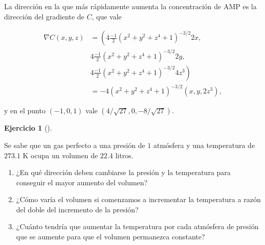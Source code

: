 \documentclass[
  spanish,
  a4paper,
]{scrreport}
\theoremstyle{definition}
\newtheorem{exercise}{Ejercicio}[chapter]
\theoremstyle{remark}
\begin{document}
\begin{tcolorbox}[enhanced jigsaw, arc=.35mm, bottomrule=.15mm, bottomtitle=1mm, breakable, colback=white, colbacktitle=quarto-callout-tip-color!10!white, colframe=quarto-callout-tip-color-frame, coltitle=black, left=2mm, leftrule=.75mm, opacityback=0, opacitybacktitle=0.6, rightrule=.15mm, title=\textcolor{quarto-callout-tip-color}{\faLightbulb}\hspace{0.5em}{Solución}, titlerule=0mm, toprule=.15mm, toptitle=1mm]

La dirección en la que más rápidamente aumenta la concentración de AMP
es la dirección del gradiente de \(C\), que vale

\begin{align*}
\nabla C(x,y,z) 
&= \left(4\frac{-1}{2}(x^2+y^2+z^4+1)^{-3/2}2x\right., \\
& 4\frac{-1}{2}(x^2+y^2+z^4+1)^{-3/2}2y, \\
& \left. 4\frac{-1}{2}(x^2+y^2+z^4+1)^{-3/2}4z^3\right) \\
&= -4(x^2+y^2+z^4+1)^{-3/2}(x, y, 2z^3),
\end{align*}

y en el punto \((-1, 0, 1)\) vale \((4/\sqrt{27}, 0, -8/\sqrt{27})\).

\end{tcolorbox}

\begin{exercise}[]\protect\hypertarget{exr-derivada-direccional-gas-perfecto}{}\label{exr-derivada-direccional-gas-perfecto}

Se sabe que un gas perfecto a una presión de \(1\) atmósfera y una
temperatura de \(273.1\) K ocupa un volumen de \(22.4\) litros.

\begin{enumerate}
\def\labelenumi{\alph{enumi}.}
\item
  ¿En qué dirección deben cambiarse la presión y la temperatura para
  conseguir el mayor aumento del volumen?
\item
  ¿Cómo varía el volumen si comenzamos a incrementar la temperatura a
  razón del doble del incremento de la presión?
\item
  ¿Cuánto tendría que aumentar la temperatura por cada atmósfera de
  presión que se aumente para que el volumen permanezca constante?
\end{enumerate}

\end{exercise}
\end{document}
